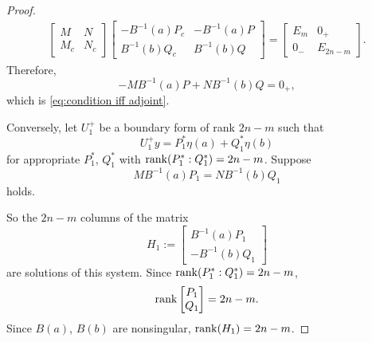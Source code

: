 \documentclass[11pt, oneside, a4paper]{article}
\begin{document}
\begin{proof}
{    }
    \begin{align*}
        \begin{bmatrix}
            M & N\\
            M_c & N_c
        \end{bmatrix}
        \begin{bmatrix}
            -B^{-1}(a)P_c & -B^{-1}(a)P\\
            B^{-1}(b)Q_c & B^{-1}(b)Q
        \end{bmatrix}
        =
        \begin{bmatrix}
            E_m & 0_+\\
            0_- & E_{2n-m}
        \end{bmatrix}.
    \end{align*}
    Therefore,
    \[-MB^{-1}(a)P + NB^{-1}(b)Q = 0_+,\]
    which is \eqref{eq:condition iff adjoint}.

    Conversely, let $U_1^+$ be a boundary form of rank $2n-m$ such that
    \[U_1^+y = P_1^*\eta(a) + Q_1^*\eta(b)\]
    for appropriate $P_1^*$, $Q_1^*$ with $\operatorname{rank}(P_1^*:Q_1^*)=2n-m$. Suppose
    \begin{equation}\label{eq:condition iff adjoint converse}
        MB^{-1}(a)P_1 = NB^{-1}(b)Q_1
    \end{equation}
    holds.

    So the $2n-m$ columns of the matrix
    \[H_1:= \begin{bmatrix}
        B^{-1}(a)P_1\\
        -B^{-1}(b)Q_1
    \end{bmatrix}\]
    are solutions of this system. Since $\operatorname{rank}(P_1^*:Q_1^*)=2n-m$,
    \[\operatorname{rank}\begin{bmatrix}P_1\\ Q_1\end{bmatrix}=2n-m.\]
    Since $B(a)$, $B(b)$ are nonsingular, $\operatorname{rank}(H_1)=2n-m$.


\end{proof}
\end{document}
